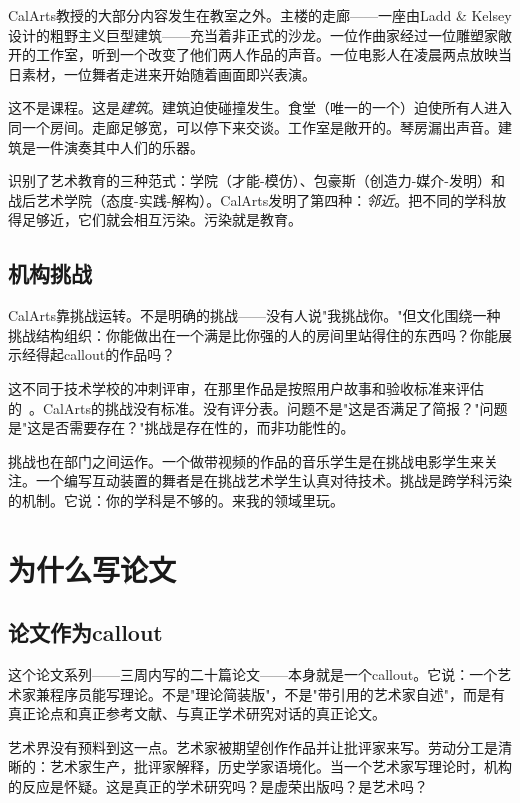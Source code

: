 \documentclass[10pt,letterpaper,twocolumn]{article}
\begin{document}
CalArts教授的大部分内容发生在教室之外。主楼的走廊——一座由Ladd \& Kelsey设计的粗野主义巨型建筑——充当着非正式的沙龙。一位作曲家经过一位雕塑家敞开的工作室，听到一个改变了他们两人作品的声音。一位电影人在凌晨两点放映当日素材，一位舞者走进来开始随着画面即兴表演。

这不是课程。这是\emph{建筑}。建筑迫使碰撞发生。食堂（唯一的一个）迫使所有人进入同一个房间。走廊足够宽，可以停下来交谈。工作室是敞开的。琴房漏出声音。建筑是一件演奏其中人们的乐器。

\citet{deduve1994attitude}识别了艺术教育的三种范式：学院（才能-模仿）、包豪斯（创造力-媒介-发明）和战后艺术学院（态度-实践-解构）。CalArts发明了第四种：\emph{邻近}。把不同的学科放得足够近，它们就会相互污染。污染就是教育。

\subsection{机构挑战}

CalArts靠挑战运转。不是明确的挑战——没有人说"我挑战你。"但文化围绕一种挑战结构组织：你能做出在一个满是比你强的人的房间里站得住的东西吗？你能展示经得起callout的作品吗？

这不同于技术学校的冲刺评审，在那里作品是按照用户故事和验收标准来评估的~\citep{vinsel2020innovation}。CalArts的挑战没有标准。没有评分表。问题不是"这是否满足了简报？"问题是"这是否需要存在？"挑战是存在性的，而非功能性的。

挑战也在部门之间运作。一个做带视频的作品的音乐学生是在挑战电影学生来关注。一个编写互动装置的舞者是在挑战艺术学生认真对待技术。挑战是跨学科污染的机制。它说：你的学科是不够的。来我的领域里玩。

\section{为什么写论文}

\subsection{论文作为callout}

这个论文系列——三周内写的二十篇论文——本身就是一个callout。它说：一个艺术家兼程序员能写理论。不是"理论简装版"，不是"带引用的艺术家自述"，而是有真正论点和真正参考文献、与真正学术研究对话的真正论文。

艺术界没有预料到这一点。艺术家被期望创作作品并让批评家来写。劳动分工是清晰的：艺术家生产，批评家解释，历史学家语境化。当一个艺术家写理论时，机构的反应是怀疑。这是真正的学术研究吗？是虚荣出版吗？是艺术吗？
\end{document}

